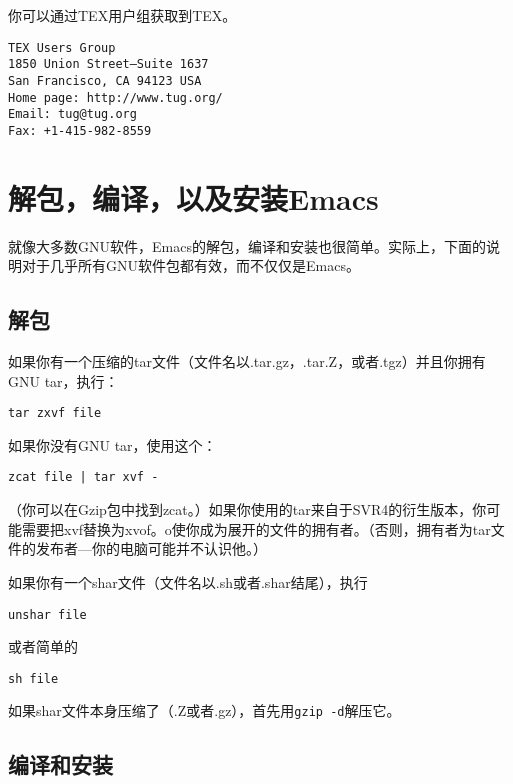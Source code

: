 你可以通过TEX用户组获取到TEX。

\begin{verbatim}
TEX Users Group
1850 Union Street—Suite 1637
San Francisco, CA 94123 USA
Home page: http://www.tug.org/
Email: tug@tug.org
Fax: +1-415-982-8559
\end{verbatim}

\section{解包，编译，以及安装Emacs}
\label{section:E-Unpacking-Building-and-Installing-Emacs}

就像大多数GNU软件，Emacs的解包，编译和安装也很简单。实际上，下面的说明对于几乎所有GNU软件包都有效，而不仅仅是Emacs。

\subsection{解包}
\label{section:E-Unpacking}

如果你有一个压缩的tar文件（文件名以.tar.gz，.tar.Z，或者.tgz）并且你拥有GNU tar，执行：

\begin{verbatim}
tar zxvf file
\end{verbatim}

如果你没有GNU tar，使用这个：

\begin{verbatim}
zcat file | tar xvf -
\end{verbatim}

（你可以在Gzip包中找到zcat。）如果你使用的tar来自于SVR4的衍生版本，你可能需要把xvf替换为xvof。o使你成为展开的文件的拥有者。（否则，拥有者为tar文件的发布者---你的电脑可能并不认识他。）

如果你有一个shar文件（文件名以.sh或者.shar结尾），执行

\begin{verbatim}
unshar file
\end{verbatim}

或者简单的

\begin{verbatim}
sh file
\end{verbatim}

如果shar文件本身压缩了（.Z或者.gz），首先用\texttt{gzip -d}解压它。

\subsection{编译和安装}
\label{section:E-Building-and-Installing}

